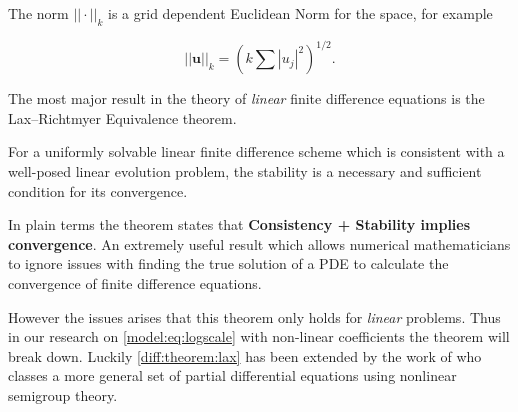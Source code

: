 \documentclass[../main.tex]{subfiles}
\begin{document}
  The norm $|| \cdot ||_k$ is a grid dependent Euclidean Norm for the space, for example

  $$
    || \mathbf{u} ||_k = \left( k \sum |u_j|^2 \right)^{1/2}.
  $$

  The most major result in the theory of \emph{linear} finite difference equations is the  Lax–Richtmyer Equivalence theorem.

  \begin{theorem}\label{diff:theorem:lax}
    For a uniformly solvable linear finite difference scheme which is consistent with a well-posed linear evolution problem, the stability is a necessary and sufficient condition for its convergence.
  \end{theorem}

  In plain terms the theorem states that \textbf{Consistency + Stability implies convergence}. An extremely useful result which allows numerical mathematicians to ignore issues with finding the true solution of a PDE to calculate the convergence of finite difference equations.

  However the issues arises that this theorem only holds for \emph{linear} problems. Thus in our research on \autoref{model:eq:logscale} with non-linear coefficients the theorem will break down. Luckily \autoref{diff:theorem:lax} has been extended by the work of \cite{rosinger2008} who classes a more general set of partial differential equations using nonlinear semigroup theory.
\end{document}
